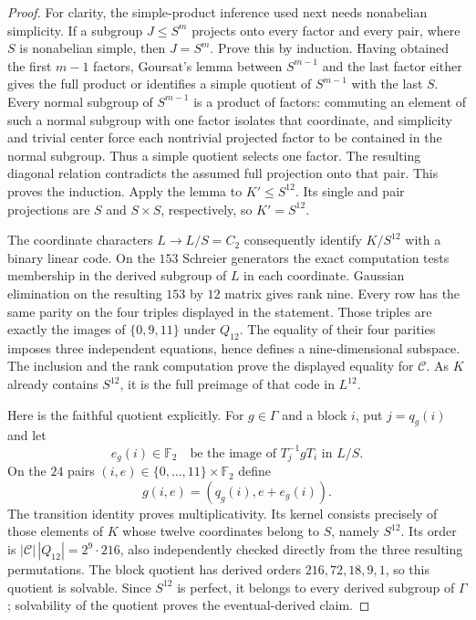 \begin{proof}
For clarity, the simple-product inference used next needs
nonabelian simplicity. If a subgroup $J\leq S^m$ projects
onto every factor and every pair, where $S$ is nonabelian
simple, then $J=S^m$. Prove this by induction. Having obtained
the first $m-1$ factors, Goursat's lemma between $S^{m-1}$
and the last factor either gives the full product or identifies
a simple quotient of $S^{m-1}$ with the last $S$. Every normal
subgroup of $S^{m-1}$ is a product of factors: commuting an
element of such a normal subgroup with one factor isolates
that coordinate, and simplicity and trivial center force
each nontrivial projected factor to be contained in the
normal subgroup. Thus a simple quotient selects one factor.
The resulting diagonal relation contradicts the assumed full
projection onto that pair. This proves the induction.
Apply the lemma to $K'\leq S^{12}$. Its single and pair
projections are $S$ and $S\times S$, respectively, so
$K'=S^{12}$.

The coordinate characters $L\to L/S=C_2$ consequently
identify $K/S^{12}$ with a binary linear code. On the $153$
Schreier generators the exact computation tests membership
in the derived subgroup of $L$ in each coordinate. Gaussian
elimination on the resulting $153$ by $12$ matrix gives rank
nine. Every row has the same parity on the four triples
displayed in the statement. Those triples are exactly the
images of $\{0,9,11\}$ under $Q_{12}$. The equality of their
four parities imposes three independent equations, hence
defines a nine-dimensional subspace. The inclusion and the
rank computation prove the displayed equality for $\mathcal C$.
As $K$ already contains $S^{12}$, it is the full preimage of
that code in $L^{12}$.

Here is the faithful quotient explicitly. For $g\in\Gamma$
and a block $i$, put $j=q_g(i)$ and let
\[
  e_g(i)\in\mathbb F_2
       \quad\text{be the image of }T_j^{-1}gT_i\text{ in }L/S.
\]
On the $24$ pairs $(i,e)\in\{0,\ldots,11\}\times\mathbb F_2$
define
\[
                    g(i,e)=(q_g(i),e+e_g(i)).
\]
The transition identity proves multiplicativity. Its kernel
consists precisely of those elements of $K$ whose twelve
coordinates belong to $S$, namely $S^{12}$. Its order is
$|\mathcal C|\,|Q_{12}|=2^9\cdot216$, also independently
checked directly from the three resulting permutations.
The block quotient has derived orders
$216,72,18,9,1$, so this quotient is solvable. Since $S^{12}$
is perfect, it belongs to every derived subgroup of $\Gamma$;
solvability of the quotient proves the eventual-derived claim.


\end{proof}
